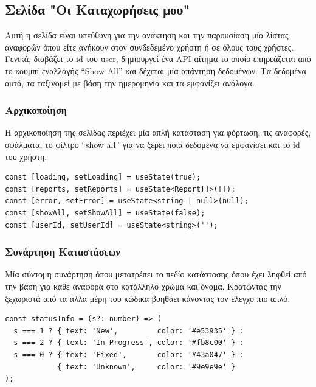 \subsection{Σελίδα "Οι Καταχωρήσεις μου"}
Αυτή η σελίδα είναι υπεύθυνη για την ανάκτηση και την παρουσίαση μία λίστας αναφορών όπου είτε ανήκουν στον συνδεδεμένο χρήστη ή σε όλους τους χρήστες. Γενικά, διαβάζει το id του user, δημιουργεί ένα API αίτημα το οποίο επηρεάζεται από το κουμπί εναλλαγής “Show All” και δέχεται μία απάντηση δεδομένων. Τα δεδομένα αυτά, τα ταξινομεί με βάση την ημερομηνία και τα εμφανίζει ανάλογα. 

\subsubsection*{Αρχικοποίηση}
Η αρχικοποίηση της σελίδας περιέχει μία απλή κατάσταση για φόρτωση, τις αναφορές, σφάλματα, το φίλτρο “show all” για να ξέρει ποια δεδομένα να εμφανίσει και το id του χρήστη.
\\
\begin{lstlisting}
const [loading, setLoading] = useState(true);
const [reports, setReports] = useState<Report[]>([]);
const [error, setError] = useState<string | null>(null);
const [showAll, setShowAll] = useState(false);
const [userId, setUserId] = useState<string>('');
\end{lstlisting}

\subsubsection*{Συνάρτηση Καταστάσεων}
Μία σύντομη συνάρτηση όπου μετατρέπει το πεδίο κατάστασης όπου έχει ληφθεί από την βάση για κάθε αναφορά στο κατάλληλο χρώμα και όνομα. Κρατώντας την ξεχωριστά από τα άλλα μέρη του κώδικα βοηθάει κάνοντας τον έλεγχο πιο απλό.
\\
\begin{lstlisting}
const statusInfo = (s?: number) => (
  s === 1 ? { text: 'New',         color: '#e53935' } :
  s === 2 ? { text: 'In Progress', color: '#fb8c00' } :
  s === 0 ? { text: 'Fixed',       color: '#43a047' } :
            { text: 'Unknown',     color: '#9e9e9e' }
);

\end{lstlisting}

